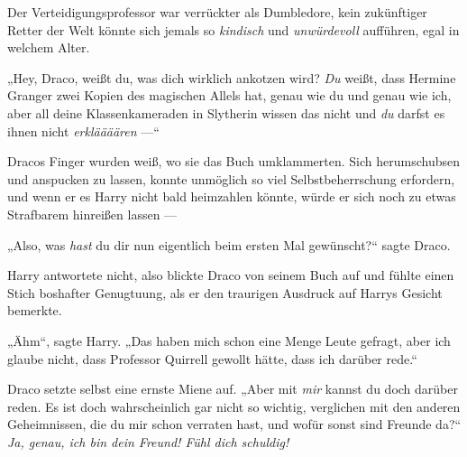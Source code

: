 Der Verteidigungsprofessor war verrückter als Dumbledore, kein zukünftiger Retter der Welt könnte sich jemals so \emph{kindisch} und \emph{unwürdevoll} aufführen, egal in welchem Alter.

„Hey, Draco, weißt du, was dich wirklich ankotzen wird? \emph{Du} weißt, dass Hermine Granger zwei Kopien des magischen Allels hat, genau wie du und genau wie ich, aber all deine Klassenkameraden in Slytherin wissen das nicht und \emph{du} darfst es ihnen nicht \emph{erkläääären} —“

Dracos Finger wurden weiß, wo sie das Buch umklammerten. Sich herumschubsen und anspucken zu lassen, konnte unmöglich so viel Selbstbeherrschung erfordern, und wenn er es Harry nicht bald heimzahlen könnte, würde er sich noch zu etwas Strafbarem hinreißen lassen —

„Also, was \emph{hast} du dir nun eigentlich beim ersten Mal gewünscht?“ sagte Draco.

Harry antwortete nicht, also blickte Draco von seinem Buch auf und fühlte einen Stich boshafter Genugtuung, als er den traurigen Ausdruck auf Harrys Gesicht bemerkte.

„Ähm“, sagte Harry.
„Das haben mich schon eine Menge Leute gefragt, aber ich glaube nicht, dass Professor Quirrell gewollt hätte, dass ich darüber rede.“

Draco setzte selbst eine ernste Miene auf.
„Aber mit \emph{mir} kannst du doch darüber reden. Es ist doch wahrscheinlich gar nicht so wichtig, verglichen mit den anderen Geheimnissen, die du mir schon verraten hast, und wofür sonst sind Freunde da?“ \emph{Ja, genau, ich bin dein Freund! Fühl dich schuldig!}

